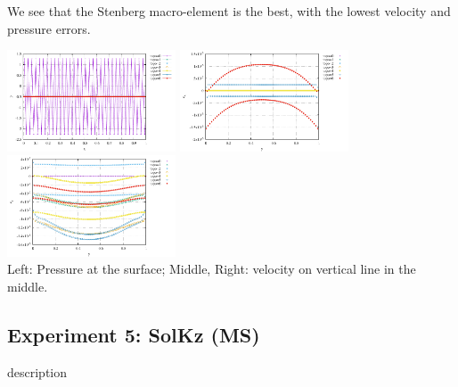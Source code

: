 We see that the Stenberg macro-element is the best, with the lowest velocity and pressure errors.

\begin{center}
\includegraphics[width=5cm]{python_codes/fieldstone_78/results/pressure_top_exp4.pdf}
\includegraphics[width=5cm]{python_codes/fieldstone_78/results/vx_profile_exp4.pdf}
\includegraphics[width=5cm]{python_codes/fieldstone_78/results/vy_profile_exp4.pdf}\\
{\captionfont Left: Pressure at the surface; Middle, Right: velocity on vertical line in the middle.}
\end{center}





\newpage
\subsection*{Experiment 5: SolKz (MS)}

{\color{red} description}

